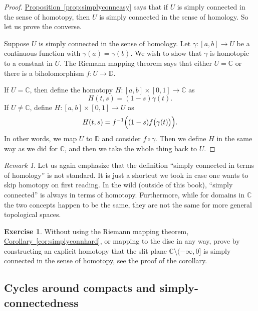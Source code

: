 \documentclass[12pt,openany]{book}
\newcommand{\C}{{\mathbb{C}}}
\newcommand{\D}{{\mathbb{D}}}
\newcommand{\myquote}[1]{``#1''}
\theoremstyle{plain}
\theoremstyle{remark}
\newtheorem{remark}[thm]{Remark}
\theoremstyle{definition}
\newenvironment{exbox}{%
    \def\FrameCommand{\vrule width 1pt \relax\hspace{10pt}}%
    \MakeFramed{\advance\hsize-\width\FrameRestore}%
}{%
    \endMakeFramed
}
\theoremstyle{exercise}
\newtheorem{exercise}{Exercise}[section]
\theoremstyle{example}
\newcommand{\propref}[1]{\hyperref[#1]{Proposition~\ref*{#1}}}
\newcommand{\corref}[1]{\hyperref[#1]{Corollary~\ref*{#1}}}
\begin{document}
\begin{proof}
\propref{prop:simplyconneasy} says that if $U$ is
simply connected in the sense of homotopy, then $U$ is simply connected
in the sense of homology.  So let us prove the converse.

Suppose $U$ is simply connected in
the sense of homology.
Let $\gamma \colon [a,b] \to U$ be a continuous function with
$\gamma(a)=\gamma(b)$.  We wish to show that $\gamma$ is homotopic to a
constant in $U$.
The Riemann mapping theorem says that either $U =
\C$ or there is a biholomorphism $f \colon U \to \D$.

If $U = \C$, then define the homotopy $H \colon [a,b] \times [0,1] \to
\C$ as
\begin{equation*}
H(t,s) = (1-s) \gamma(t) .
\end{equation*}
If $U \not= \C$, define $H \colon [a,b] \times [0,1] \to U$ as
\begin{equation*}
H(t,s) = f^{-1} \Bigl( (1-s) f \bigl( \gamma(t) \bigr) \Bigr) .
\end{equation*}
In other words, we map $U$ to $\D$ and consider $f \circ \gamma$.
Then we define $H$ in the same way as we did for $\C$, and then we
take the whole thing back to $U$.
\end{proof}

\begin{remark}
Let us again emphasize that the definition
\myquote{simply connected in terms of homology} is not standard.
It is just a shortcut we took in case one wants
to skip homotopy on first reading.  In the wild (outside of this book),
\myquote{simply connected} is
always in terms of homotopy.  Furthermore, while for domains in $\C$ the two
concepts happen to be the same, they are not the same for more
general topological spaces.
\end{remark}

\begin{exbox}
\begin{exercise}
Without using the Riemann mapping theorem, \corref{cor:simplyconnhard},
or mapping to the disc in any way, prove by constructing an explicit homotopy
that the slit plane $\C \setminus (-\infty,0]$ is simply connected in
the sense of homotopy, see the proof of the corollary.
\end{exercise}
\end{exbox}

\subsection{Cycles around compacts and simply-connectedness}\label{subsec:patharoundK}
\end{document}
